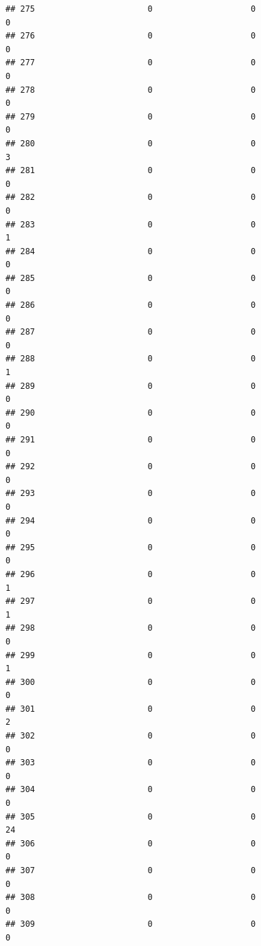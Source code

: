 \documentclass[
]{article}
\begin{document}
\begin{verbatim}
## 275                       0                    0                      0
## 276                       0                    0                      0
## 277                       0                    0                      0
## 278                       0                    0                      0
## 279                       0                    0                      0
## 280                       0                    0                      3
## 281                       0                    0                      0
## 282                       0                    0                      0
## 283                       0                    0                      1
## 284                       0                    0                      0
## 285                       0                    0                      0
## 286                       0                    0                      0
## 287                       0                    0                      0
## 288                       0                    0                      1
## 289                       0                    0                      0
## 290                       0                    0                      0
## 291                       0                    0                      0
## 292                       0                    0                      0
## 293                       0                    0                      0
## 294                       0                    0                      0
## 295                       0                    0                      0
## 296                       0                    0                      1
## 297                       0                    0                      1
## 298                       0                    0                      0
## 299                       0                    0                      1
## 300                       0                    0                      0
## 301                       0                    0                      2
## 302                       0                    0                      0
## 303                       0                    0                      0
## 304                       0                    0                      0
## 305                       0                    0                     24
## 306                       0                    0                      0
## 307                       0                    0                      0
## 308                       0                    0                      0
## 309                       0                    0                      0

\end{verbatim}
\end{document}
